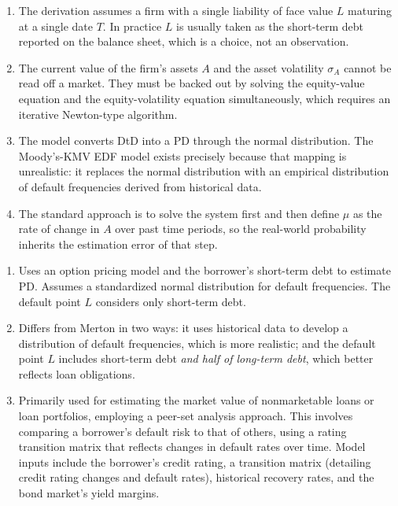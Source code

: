 \begin{crgapbox}
\begin{enumerate}
\item {} The
derivation assumes a firm with a single liability of face value $L$ maturing at a
single date $T$. In practice $L$ is usually taken as the short-term debt reported
on the balance sheet, which is a choice, not an observation.
\item {} The current value of the
firm's assets $A$ and the asset volatility $\sigma_A$ cannot be read off a
market. They must be backed out by solving the equity-value equation and the
equity-volatility equation simultaneously, which requires an iterative
Newton-type algorithm.
\item {} The model converts DtD into a PD through the normal distribution. The
Moody's-KMV EDF model exists precisely because that mapping is unrealistic: it
replaces the normal distribution with an empirical distribution of default
frequencies derived from historical data.
\item {} The
standard approach is to solve the system first and then define $\mu$ as the rate
of change in $A$ over past time periods, so the real-world probability inherits
the estimation error of that step.
\end{enumerate}
\end{crgapbox}


\begin{enumerate}
\item {} Uses an option pricing model and the borrower's
short-term debt to estimate PD. Assumes a standardized normal distribution for
default frequencies. The default point $L$ considers only short-term debt.
\item {} Differs from
Merton in two ways: it uses historical data to develop a distribution of default
frequencies, which is more realistic; and the default point $L$ includes
short-term debt \emph{and half of long-term debt}, which better reflects loan
obligations.
\item {} Primarily used for estimating the market value
of nonmarketable loans or loan portfolios, employing a peer-set analysis
approach. This involves comparing a borrower's default risk to that of others,
using a rating transition matrix that reflects changes in default rates over time.
Model inputs include the borrower's credit rating, a transition matrix (detailing
credit rating changes and default rates), historical recovery rates, and the bond
market's yield margins.
\end{enumerate}

